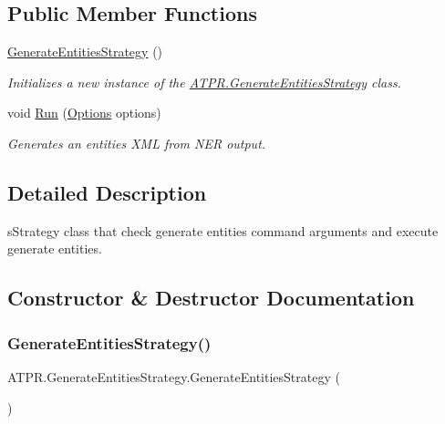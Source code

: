 \subsection*{Public Member Functions}
\begin{DoxyCompactItemize}
\item 
\hyperlink{class_a_t_p_r_1_1_generate_entities_strategy_a9c720ecc2374f2ca6528ccacf422b327}{Generate\+Entities\+Strategy} ()
\begin{DoxyCompactList}\small\item\em Initializes a new instance of the \hyperlink{class_a_t_p_r_1_1_generate_entities_strategy}{A\+T\+P\+R.\+Generate\+Entities\+Strategy} class. \end{DoxyCompactList}\item 
void \hyperlink{class_a_t_p_r_1_1_generate_entities_strategy_a05c83e5d9d7ea2b05f4de5dab1a87f06}{Run} (\hyperlink{class_a_t_p_r_1_1_options}{Options} options)
\begin{DoxyCompactList}\small\item\em Generates an entities X\+ML from N\+ER output. \end{DoxyCompactList}\end{DoxyCompactItemize}


\subsection{Detailed Description}
s\+Strategy class that check generate entities command arguments and execute generate entities. 



\subsection{Constructor \& Destructor Documentation}
\hypertarget{class_a_t_p_r_1_1_generate_entities_strategy_a9c720ecc2374f2ca6528ccacf422b327}{}\label{class_a_t_p_r_1_1_generate_entities_strategy_a9c720ecc2374f2ca6528ccacf422b327} 
\subsubsection{\texorpdfstring{Generate\+Entities\+Strategy()}{GenerateEntitiesStrategy()}}
{\footnotesize\ttfamily A\+T\+P\+R.\+Generate\+Entities\+Strategy.\+Generate\+Entities\+Strategy (\begin{DoxyParamCaption}{ }\end{DoxyParamCaption})\hspace{0.3cm}{\ttfamily [inline]}}



